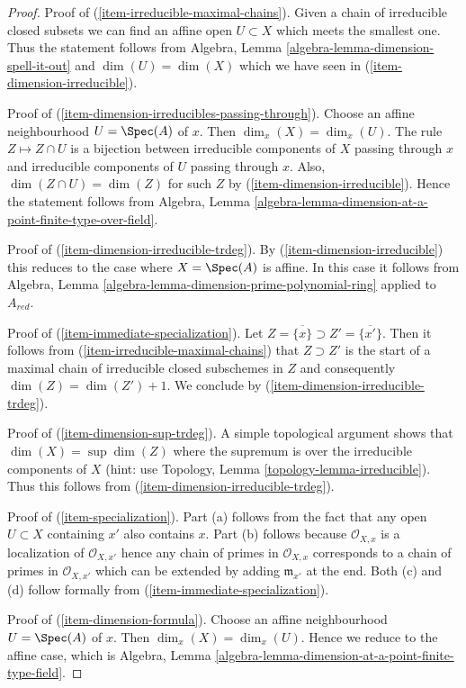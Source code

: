 \begin{proof}
\medskip\noindent
Proof of (\ref{item-irreducible-maximal-chains}). Given a chain
of irreducible closed subsets we can find an affine open $U \subset X$
which meets the smallest one. Thus the statement follows from
Algebra, Lemma \ref{algebra-lemma-dimension-spell-it-out} 
and $\dim(U) = \dim(X)$ which we have seen in
(\ref{item-dimension-irreducible}).

\medskip\noindent
Proof of (\ref{item-dimension-irreducibles-passing-through}).
Choose an affine neighbourhood $U = \Spec(A)$ of $x$. Then
$\dim_x(X) = \dim_x(U)$. The rule $Z \mapsto Z \cap U$
is a bijection between irreducible components of $X$ passing through
$x$ and irreducible components of $U$ passing through $x$.
Also, $\dim(Z \cap U) = \dim(Z)$ for such $Z$ by
(\ref{item-dimension-irreducible}).
Hence the statement follows from
Algebra, Lemma \ref{algebra-lemma-dimension-at-a-point-finite-type-over-field}.

\medskip\noindent
Proof of (\ref{item-dimension-irreducible-trdeg}). By
(\ref{item-dimension-irreducible}) this reduces to the case where
$X = \Spec(A)$ is affine. In this case it follows from
Algebra, Lemma \ref{algebra-lemma-dimension-prime-polynomial-ring}
applied to $A_{red}$.

\medskip\noindent
Proof of (\ref{item-immediate-specialization}).
Let $Z = \overline{\{x\}} \supset Z' = \overline{\{x'\}}$.
Then it follows from (\ref{item-irreducible-maximal-chains}) that
$Z \supset Z'$ is the start of a maximal chain of
irreducible closed subschemes in $Z$
and consequently $\dim(Z) = \dim(Z') + 1$.
We conclude by (\ref{item-dimension-irreducible-trdeg}).

\medskip\noindent
Proof of (\ref{item-dimension-sup-trdeg}). A simple topological argument
shows that $\dim(X) = \sup \dim(Z)$ where the supremum is over the
irreducible components of $X$ (hint: use
Topology, Lemma \ref{topology-lemma-irreducible}).
Thus this follows from (\ref{item-dimension-irreducible-trdeg}).

\medskip\noindent
Proof of (\ref{item-specialization}). Part (a) follows from the
fact that any open $U \subset X$ containing $x'$ also contains $x$.
Part (b) follows because $\mathcal{O}_{X, x}$ is a localization of
$\mathcal{O}_{X, x'}$ hence any chain of primes in $\mathcal{O}_{X, x}$
corresponds to a chain of primes in $\mathcal{O}_{X, x'}$ which can
be extended by adding $\mathfrak m_{x'}$ at the end.
Both (c) and (d) follow formally from (\ref{item-immediate-specialization}).

\medskip\noindent
Proof of (\ref{item-dimension-formula}). Choose an affine
neighbourhood $U = \Spec(A)$ of $x$. Then $\dim_x(X) = \dim_x(U)$.
Hence we reduce to the affine case, which is
Algebra, Lemma \ref{algebra-lemma-dimension-at-a-point-finite-type-field}.


\end{proof}

